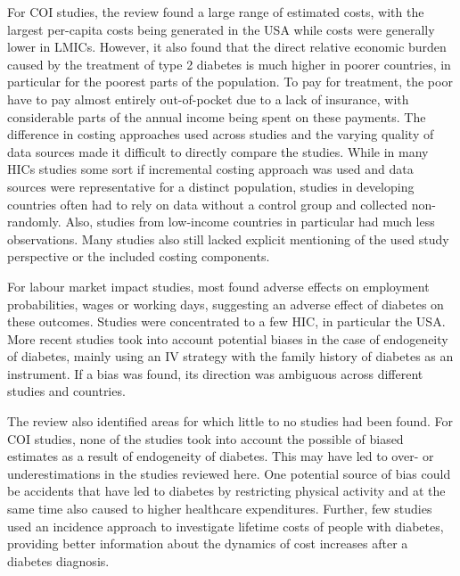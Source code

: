 For \ac{COI} studies, the review found a large range of estimated costs, with the largest per-capita costs being generated in the USA while costs were generally lower in \acp{LMIC}. However, it also found that the direct relative economic burden caused by the treatment of type 2 diabetes is much higher in poorer countries, in particular for the poorest parts of the population. To pay for treatment, the poor have to pay almost entirely out-of-pocket due to a lack of insurance, with considerable parts of the annual income being spent on these payments. The difference in costing approaches used across studies and the varying quality of data sources made it difficult to directly compare the studies. While in many \acp{HIC} studies some sort if incremental costing approach was used and data sources were representative for a distinct population, studies in developing countries often had to rely on data without a control group and collected non-randomly. Also, studies from low-income countries in particular had much less observations. Many studies also still lacked explicit mentioning of the used study perspective or the included costing components. 

For labour market impact studies, most found adverse effects on employment probabilities, wages or working days, suggesting an adverse effect of diabetes on these outcomes. Studies were concentrated to a few \ac{HIC}, in particular the USA. More recent studies took into account potential biases in the case of endogeneity of diabetes, mainly using an \ac{IV} strategy with the family history of diabetes as an instrument. If a bias was found, its direction was ambiguous across different studies and countries. 

The review also identified areas for which little to no studies had been found. For \ac{COI} studies, none of the studies took into account the possible of biased estimates as a result of endogeneity of diabetes. This may have led to over- or underestimations in the studies reviewed here. One potential source of bias could be accidents that have led to diabetes by restricting physical activity and at the same time also caused to higher healthcare expenditures. Further, few studies used an incidence approach to investigate lifetime costs of people with diabetes, providing better information about the dynamics of cost increases after a diabetes diagnosis. 

